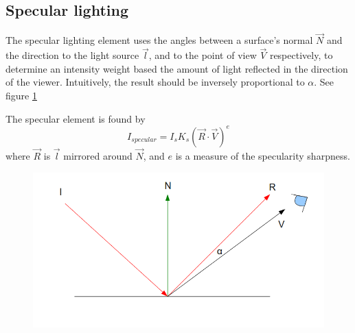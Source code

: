 \subsection{Specular lighting}
The specular lighting element uses the angles between a surface's normal
$\vec{N}$ and the direction to the light source $\vec{l}$, and to the point of
view $\vec{V}$ respectively, to determine an intensity weight based the amount
of light reflected in the direction of the viewer. Intuitively, the result
should be inversely proportional to $\alpha$. See figure \ref{fig:specAng}

The specular element is found by
$$I_{specular} = I_{s}K_{s}(\vec{R}\cdot\vec{V})^e$$
where $\vec{R}$ is $\vec{l}$ mirrored around $\vec{N}$, and $e$ is a measure of
the specularity sharpness.

\begin{figure}[!hbtp]
	\centering
	\scalebox{0.7}
	{\includegraphics{pics/specularAngle.png}}
	\caption{}
	\label{fig:specAng}
\end{figure}
